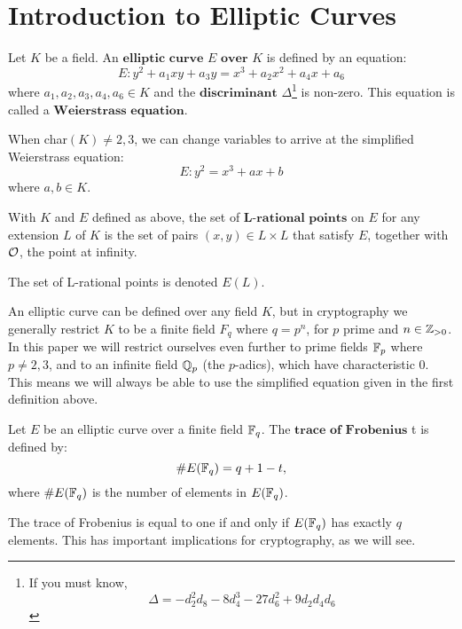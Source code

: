 \label{sec:elliptic-curves}

\section{Introduction to Elliptic Curves}
\begin{defn}
Let $K$ be a field. An $\textbf{elliptic curve $E$ over $K$}$ is defined by an equation:
$$E : y^2 + a_1xy + a_3y = x^3 + a_2x^2 + a_4x + a_6$$
where $a_1, a_2, a_3, a_4, a_6 \in K$ and the $\textbf{discriminant}$ $\Delta$\footnote{If you must know, $$\Delta = -d^2_2d_8 - 8d^3_4 - 27d_6^2 + 9d_2d_4d_6$$ } is non-zero. This equation is called a $\textbf{Weierstrass equation}$.

When char$(K) \neq 2, 3$, we can change variables
to arrive at the simplified Weierstrass equation:
$$ E : y^2 = x^3 + ax + b $$
where $a, b \in K$. 
\end{defn}

\begin{defn}
With $K$ and $E$ defined as above, the set of $\textbf{L-rational points}$ on $E$ for any extension $L$ of $K$ is the set of pairs $(x, y) \in L \times L$ that
satisfy $E$, together with $\mathcal{O}$, the point at infinity.

The set of L-rational points is denoted $E(L)$.
\end{defn}

An elliptic curve can be defined over any field $K$, but in cryptography we generally restrict $K$ to be a finite field $F_q$ where
$q = p^n$, for $p$ prime and $n \in \mathbb{Z}_{>0}$. In this paper we will restrict ourselves even further to prime fields
$\mathbb{F}_p$ where $p \neq 2, 3$, and to an infinite field $\mathbb{Q}_p$ (the $p$-adics), which have characteristic 0. This means we will always be able to use the
simplified equation given in the first definition above.

\begin{defn}
Let $E$ be an elliptic curve over a finite field $\mathbb{F}_q$. The $\textbf{trace of Frobenius}$ t is defined by:
$$ \#E(\mathbb{F}_q) = q + 1 - t, $$
where $\#E(\mathbb{F}_q)$ is the number of elements in $E(\mathbb{F}_q)$.
\end{defn}

\begin{rmk}
The trace of Frobenius is equal to one if and only if $E(\mathbb{F}_q)$ has exactly $q$ elements. This has important implications
for cryptography, as we will see.
\end{rmk}

